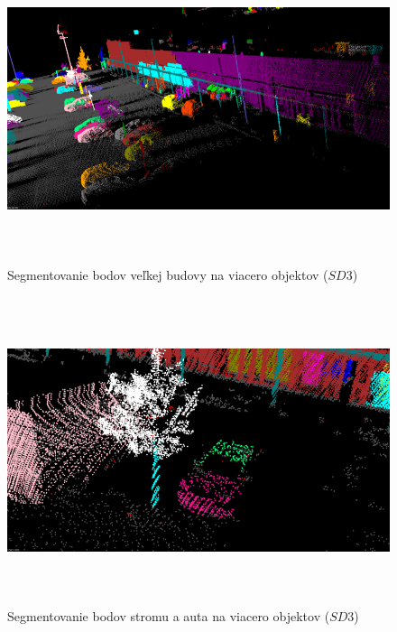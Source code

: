 \begin{figure}[htbp]
  \centering
  \includegraphics[width=16cm, height=9cm]{img/segmentation_big.png}
  \caption{Segmentovanie bodov veľkej budovy na viacero objektov ($SD3$)} 
  \label{fig:segmentation_big}
\end{figure} 

\begin{figure}[!htbp]
  \centering
  \includegraphics[width=16cm, height=9cm]{img/segmentation_devide.png}
  \caption{Segmentovanie bodov stromu a auta na viacero objektov ($SD3$)} 
  \label{fig:segmentation_devide}
\end{figure} 

\newpage\vfill
